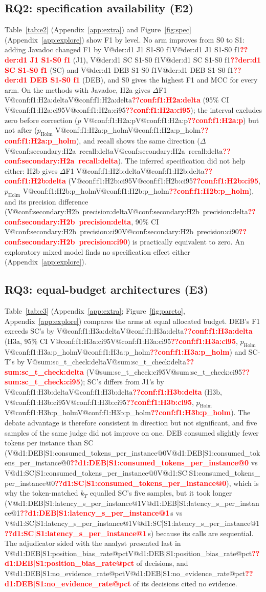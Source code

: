 \documentclass[pdflatex,iicol,sn-mathphys-num]{sn-jnl}
\makeatletter
\newcommand{\V}[1]{\ifcsname V@#1\endcsname\csname V@#1\endcsname\else\textbf{\textcolor{red}{??#1}}\fi}
\makeatother
\begin{document}
\subsection{RQ2: specification availability (E2)}
Table~\ref{tab:e2} (Appendix~\ref{app:extra}) and Figure~\ref{fig:spec} (Appendix~\ref{app:explore}) show F1 by level. No arm improves from S0 to S1: adding Javadoc changed F1 by \V{der:d1 J1 S1-S0 f1} (J1), \V{der:d1 SC S1-S0 f1} (SC) and \V{der:d1 DEB S1-S0 f1} (DEB), and S0 gives the highest F1 and MCC for every arm. On the methods with Javadoc, H2a gives $\Delta$F1 \V{conf:f1:H2a:delta} (95\% CI \V{conf:f1:H2a:ci95}); the interval excludes zero before correction ($p$ \V{conf:f1:H2a:p}) but not after ($p_\mathrm{Holm}$ \V{conf:f1:H2a:p_holm}), and recall shows the same direction ($\Delta$ \V{conf:secondary:H2a~recall:delta}). The inferred specification did not help either: H2b gives $\Delta$F1 \V{conf:f1:H2b:delta} (\V{conf:f1:H2b:ci95}, $p_\mathrm{Holm}$ \V{conf:f1:H2b:p_holm}), and its precision difference (\V{conf:secondary:H2b~precision:delta}, 90\% CI \V{conf:secondary:H2b~precision:ci90}) is practically equivalent to zero. An exploratory mixed model finds no specification effect either (Appendix~\ref{app:explore}).


\subsection{RQ3: equal-budget architectures (E3)}
Table~\ref{tab:e3} (Appendix~\ref{app:extra}; Figure~\ref{fig:pareto}, Appendix~\ref{app:explore}) compares the arms at equal allocated budget. DEB's F1 exceeds SC's by \V{conf:f1:H3a:delta} (H3a, 95\% CI \V{conf:f1:H3a:ci95}, $p_\mathrm{Holm}$ \V{conf:f1:H3a:p_holm}) and SC-T's by \V{sum:sc_t_check:delta} (\V{sum:sc_t_check:ci95}); SC's differs from J1's by \V{conf:f1:H3b:delta} (H3b, \V{conf:f1:H3b:ci95}, $p_\mathrm{Holm}$ \V{conf:f1:H3b:p_holm}). The debate advantage is therefore consistent in direction but not significant, and five samples of the same judge did not improve on one. DEB consumed slightly fewer tokens per instance than SC (\V{d1:DEB|S1:consumed_tokens_per_instance@0} vs \V{d1:SC|S1:consumed_tokens_per_instance@0}), which is why the token-matched $k_T$ equalled SC's five samples, but it took longer (\V{d1:DEB|S1:latency_s_per_instance@1}\,s vs \V{d1:SC|S1:latency_s_per_instance@1}\,s) because its calls are sequential. The adjudicator sided with the analyst presented last in \V{d1:DEB|S1:position_bias_rate@pct} of decisions, and \V{d1:DEB|S1:no_evidence_rate@pct} of its decisions cited no evidence.
\end{document}
